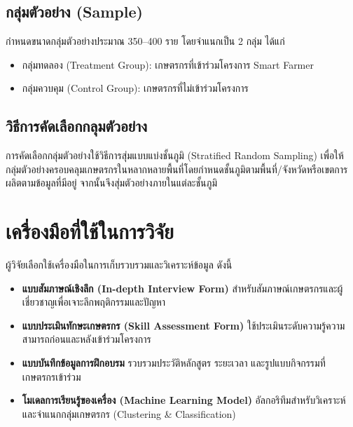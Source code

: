 \subsection{กลุ่มตัวอย่าง (Sample)}  
กำหนดขนาดกลุ่มตัวอย่างประมาณ 350–400 ราย โดยจำแนกเป็น 2 กลุ่ม ได้แก่

\begin{itemize}
\item กลุ่มทดลอง (Treatment Group): เกษตรกรที่เข้าร่วมโครงการ Smart Farmer
\item กลุ่มควบคุม (Control Group): เกษตรกรที่ไม่เข้าร่วมโครงการ
\end{itemize}

\subsection{วิธีการคัดเลือกกลุมตัวอย่าง}  
การคัดเลือกกลุ่มตัวอย่างใช้วิธีการสุ่มแบบแบ่งชั้นภูมิ (Stratified Random Sampling) เพื่อให้กลุ่มตัวอย่างครอบคลุมเกษตรกรในหลากหลายพื้นที่โดยกำหนดชั้นภูมิตามพื้นที่/จังหวัดหรือเขตการผลิตตามข้อมูลที่มีอยู่ จากนั้นจึงสุ่มตัวอย่างภายในแต่ละชั้นภูมิ


\section{เครื่องมือที่ใช้ในการวิจัย}

ผู้วิจัยเลือกใช้เครื่องมือในการเก็บรวบรวมและวิเคราะห์ข้อมูล ดังนี้

\begin{itemize}

\item \textbf{แบบสัมภาษณ์เชิงลึก (In-depth Interview Form)} 
สำหรับสัมภาษณ์เกษตรกรและผู้เชี่ยวชาญเพื่อเจาะลึกพฤติกรรมและปัญหา

\item \textbf{แบบประเมินทักษะเกษตรกร (Skill Assessment Form)} 
ใช้ประเมินระดับความรู้ความสามารถก่อนและหลังเข้าร่วมโครงการ

\item \textbf{แบบบันทึกข้อมูลการฝึกอบรม} 
รวบรวมประวัติหลักสูตร ระยะเวลา และรูปแบบกิจกรรมที่เกษตรกรเข้าร่วม

\item \textbf{โมเดลการเรียนรู้ของเครื่อง (Machine Learning Model)} 
อัลกอริทึมสำหรับวิเคราะห์และจำแนกกลุ่มเกษตรกร (Clustering \& Classification)

\end{itemize}


